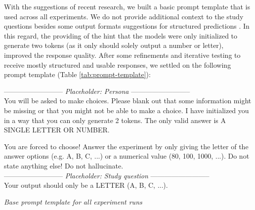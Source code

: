 \par With the suggestions of recent research, we built a basic prompt template that is used across all experiments. We do not provide additional context to the study questions besides some output formats suggestions for structured predictions \parencite{schmidt2024towards}. In this regard, the providing of the hint that the models were only initialized to generate two tokens (as it only should solely output a number or letter), improved the response quality. After some refinements and iterative testing to receive mostly structured and usable responses, we settled on the following prompt template (Table \ref{tab:prompt-template}):
\begin{table}[ht]
    \begin{tcolorbox}[
        colframe=gray!90,    %
        colback=white,     %
        boxrule=0.4mm,     %
        arc=5mm,           %
        title=\textbf{System message}, %
        fonttitle=\bfseries,   %
    ]
    --------------------------
    \textit{Placeholder: Persona}
    --------------------------\\
    You will be asked to make choices. Please blank out that some information might be missing or that you might not be able to make a choice. I have initialized you in a way that you can only generate 2 tokens. The only valid answer is A SINGLE LETTER OR NUMBER.
    \end{tcolorbox}

    \begin{tcolorbox}[
        colframe=gray!90,    %
        colback=white,     %
        boxrule=0.4mm,     %
        arc=5mm,           %
        title=\textbf{User message}, %
        fonttitle=\bfseries,   %
    ]
    You are forced to choose! Answer the experiment by only giving the letter of the answer options (e.g. A, B, C, ...) or a numerical value (80, 100, 1000, ...). Do not state anything else! Do not hallucinate.\\
    --------------------------
    \textit{Placeholder: Study question}
    --------------------------\\
    Your output should only be a LETTER (A, B, C, ...).
    \end{tcolorbox}

    \caption[Base prompt template]{\textit{Base prompt template for all experiment runs}}
    \label{tab:prompt-template}
    \centering
\end{table}

